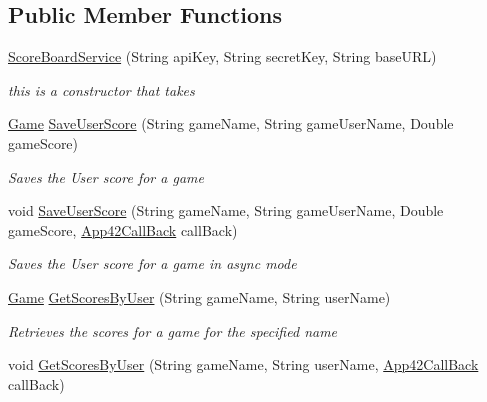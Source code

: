 \subsection*{Public Member Functions}
\begin{DoxyCompactItemize}
\item 
\hyperlink{classcom_1_1shephertz_1_1app42_1_1paas_1_1sdk_1_1csharp_1_1game_1_1_score_board_service_a1d4096eb1f7d1ceed965c5568b1a854f}{Score\+Board\+Service} (String api\+Key, String secret\+Key, String base\+U\+R\+L)
\begin{DoxyCompactList}\small\item\em this is a constructor that takes \end{DoxyCompactList}\item 
\hyperlink{classcom_1_1shephertz_1_1app42_1_1paas_1_1sdk_1_1csharp_1_1game_1_1_game}{Game} \hyperlink{classcom_1_1shephertz_1_1app42_1_1paas_1_1sdk_1_1csharp_1_1game_1_1_score_board_service_a90014b36f31566f25ea8f0e3a54540da}{Save\+User\+Score} (String game\+Name, String game\+User\+Name, Double game\+Score)
\begin{DoxyCompactList}\small\item\em Saves the User score for a game \end{DoxyCompactList}\item 
void \hyperlink{classcom_1_1shephertz_1_1app42_1_1paas_1_1sdk_1_1csharp_1_1game_1_1_score_board_service_aa85d3840e36bb55a6b5f71cc57c03396}{Save\+User\+Score} (String game\+Name, String game\+User\+Name, Double game\+Score, \hyperlink{interfacecom_1_1shephertz_1_1app42_1_1paas_1_1sdk_1_1csharp_1_1_app42_call_back}{App42\+Call\+Back} call\+Back)
\begin{DoxyCompactList}\small\item\em Saves the User score for a game in async mode \end{DoxyCompactList}\item 
\hyperlink{classcom_1_1shephertz_1_1app42_1_1paas_1_1sdk_1_1csharp_1_1game_1_1_game}{Game} \hyperlink{classcom_1_1shephertz_1_1app42_1_1paas_1_1sdk_1_1csharp_1_1game_1_1_score_board_service_ad3ff880a394654793e5725ea04a0d8d8}{Get\+Scores\+By\+User} (String game\+Name, String user\+Name)
\begin{DoxyCompactList}\small\item\em Retrieves the scores for a game for the specified name \end{DoxyCompactList}\item 
void \hyperlink{classcom_1_1shephertz_1_1app42_1_1paas_1_1sdk_1_1csharp_1_1game_1_1_score_board_service_a16d568223246e3cd044367e73f35a519}{Get\+Scores\+By\+User} (String game\+Name, String user\+Name, \hyperlink{interfacecom_1_1shephertz_1_1app42_1_1paas_1_1sdk_1_1csharp_1_1_app42_call_back}{App42\+Call\+Back} call\+Back)

\end{DoxyCompactItemize}
